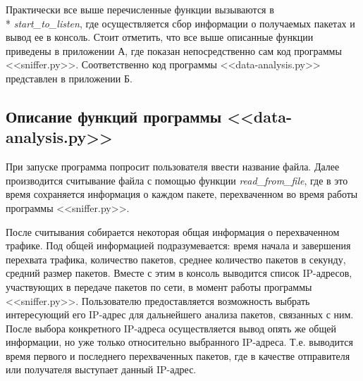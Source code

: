 \documentclass[bachelor, och, coursework]{SCWorks}
\begin{document}
    Практически все выше перечисленные функции вызываются в \\* \textit{start\_to\_listen}, где осуществляется сбор информации
    о получаемых пакетах и вывод ее в консоль. Стоит отметить, что все выше описанные функции приведены в приложении А, где
    показан непосредственно сам код программы <<sniffer.py>>. Соответственно код программы <<data-analysis.py>> представлен в приложении Б.

  \subsection{Описание функций программы <<data-analysis.py>>}

  При запуске программа попросит пользователя ввести название файла. Далее производится считывание файла с помощью функции \textit{read\_from\_file},
  где в это время сохраняется информация о каждом пакете, перехваченном во время работы программы <<sniffer.py>>.


  После считывания собирается некоторая общая информация о перехваченном трафике. Под общей информацией подразумевается: время начала и завершения
  перехвата трафика, количество пакетов, среднее количество пакетов в секунду, средний размер пакетов. Вместе с этим в консоль выводится список 
  IP-адресов, участвующих в передаче пакетов по сети, в момент работы программы <<sniffer.py>>. Пользователю предоставляется возможность выбрать
  интересующий его IP-адрес для дальнейшего анализа пакетов, связанных с ним. После выбора конкретного IP-адреса осуществляется вывод опять же общей
  информации, но уже только относительно выбранного IP-адреса. Т.е. выводится время первого и последнего перехваченных пакетов, где в качестве отправителя
  или получателя выступает данный IP-адрес. 
  
\end{document}
